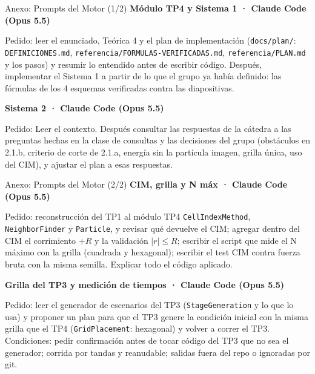 \documentclass[aspectratio=43,11pt]{beamer}
\begin{document}
\begin{frame}{Anexo: Prompts del Motor (1/2)}
  \small
  \textbf{Módulo TP4 y Sistema 1 · Claude Code (Opus 5.5)}\par\smallskip
  Pedido: leer el enunciado, Teórica 4 y el plan de implementación (\texttt{docs/plan/}: \texttt{DEFINICIONES.md}, \texttt{referencia/FORMULAS-VERIFICADAS.md}, \texttt{referencia/PLAN.md} y los pasos) y resumir lo entendido antes de escribir código. Después, implementar el Sistema 1 a partir de lo que el grupo ya había definido: las fórmulas de los 4 esquemas verificadas contra las diapositivas.\par\bigskip
  \textbf{Sistema 2 · Claude Code (Opus 5.5)}\par\smallskip
  Pedido: Leer el contexto. Después consultar las respuestas de la cátedra a las preguntas hechas en la clase de consultas y las decisiones del grupo (obstáculos en 2.1.b, criterio de corte de 2.1.a, energía sin la partícula imagen, grilla única, uso del CIM), y ajustar el plan a esas respuestas.\par
\end{frame}

\begin{frame}{Anexo: Prompts del Motor (2/2)}
  \small
  \textbf{CIM, grilla y N máx · Claude Code (Opus 5.5)}\par\smallskip
  Pedido: reconstrucción del TP1 al módulo TP4 \texttt{CellIndexMethod}, \texttt{NeighborFinder} y \texttt{Particle}, y revisar qué devuelve el CIM; agregar dentro del CIM el corrimiento $+R$ y la validación $|r| \leq R$; escribir el script que mide el N máximo con la grilla (cuadrada y hexagonal); escribir el test CIM contra fuerza bruta con la misma semilla. Explicar todo el código aplicado.\par\bigskip
  \textbf{Grilla del TP3 y medición de tiempos · Claude Code (Opus 5.5)}\par\smallskip
  Pedido: leer el generador de escenarios del TP3 (\texttt{StageGeneration} y lo que lo usa) y proponer un plan para que el TP3 genere la condición inicial con la misma grilla que el TP4 (\texttt{GridPlacement}: hexagonal) y volver a correr el TP3. Condiciones: pedir confirmación antes de tocar código del TP3 que no sea el generador; corrida por tandas y reanudable; salidas fuera del repo o ignoradas por git.\par
\end{frame}
\end{document}
